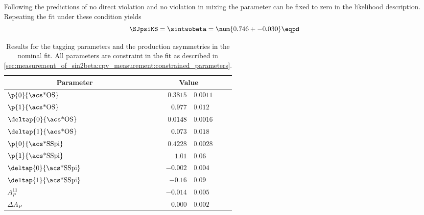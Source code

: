 Following the \SM predictions of no direct \CP violation and no \CP violation in
mixing the parameter \CJpsiKS can be fixed to zero in the likelihood
description. Repeating the fit under these condition yields
%
\begin{equation}\label{eq:measurement_of_sin2beta:cpv_measurement:results:cfixed}
    \SJpsiKS = \sintwobeta = \num{0.746 +- 0.030} \eqpd
\end{equation}
%
\begin{table}[h]
  \caption{Results for the tagging parameters and the production asymmetries in
  the nominal fit. All parameters are constraint in the fit as described in
  \cref{sec:measurement_of_sin2beta:cpv_measurement:constrained_parameters}.}
  \label{tab:measurement_of_sin2beta:cpv_measurement:results:tagging}
  \centering
  \begin{tabular}{llr@{$\,\pm\,$}l}
      \toprule
      \multicolumn{2}{c}{Parameter}         & \multicolumn{2}{c}{Value}                 \\
      \midrule
      $\p{0}{\text{\acs*{OS}}}$        &                          & $0.3815$  & $0.0011$  \\
      $\p{1}{\text{\acs*{OS}}}$        &                          & $0.977$   & $0.012$   \\
      $\deltap{0}{\text{\acs*{OS}}}$   &                          & $0.0148$  & $0.0016$  \\
      $\deltap{1}{\text{\acs*{OS}}}$   &                          & $0.073$   & $0.018$   \\
      $\p{0}{\text{\acs*{SSpi}}}$      &                          & $0.4228$  & $0.0028$  \\
      $\p{1}{\text{\acs*{SSpi}}}$      &                          & $1.01$    & $0.06$    \\
      $\deltap{0}{\text{\acs*{SSpi}}}$ &                          & $-0.002$  & $0.004$   \\
      $\deltap{1}{\text{\acs*{SSpi}}}$ &                          & $-0.16$   & $0.09$    \\
      $A_P^{11}$                &                          & $-0.014$  & $0.005$   \\
      $\Delta A_P$              &                          & $0.000$   & $0.002$   \\
      \bottomrule
    \end{tabular}
\end{table}
